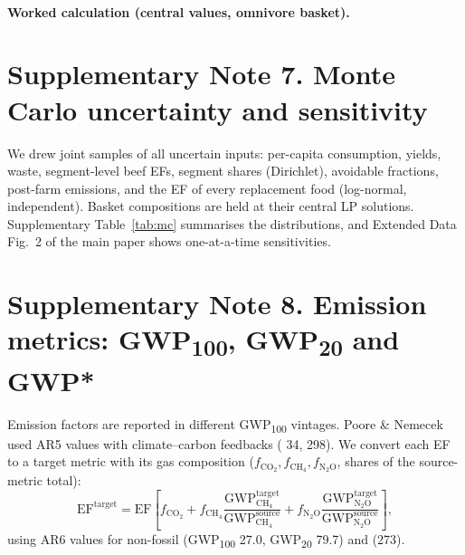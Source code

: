 \documentclass[10pt]{article}
\begin{document}
\paragraph{Worked calculation (central values, omnivore basket).}


\begin{table}[H]
\centering\small
\caption{\textbf{Annual emissions change from replacing all beef eaten by Londoners with nutritionally equivalent baskets.}
Central values. Percentages are relative to London's territorial emissions
(LEGGI 2023) and to London's consumption-based emissions.}
\label{tab:scaling}
\resizebox{\linewidth}{!}{}
\end{table}

\section{Supplementary Note 7. Monte Carlo uncertainty and sensitivity}
\label{si:mc}

We drew \NMC{} joint samples of all uncertain inputs: per-capita
consumption, yields, waste, segment-level beef EFs, segment shares
(Dirichlet), avoidable fractions, post-farm emissions, and the EF of every
replacement food (log-normal, independent). Basket compositions are held at
their central LP solutions. Supplementary Table~\ref{tab:mc} summarises the
distributions, and Extended Data Fig.~2 of the main paper shows one-at-a-time
sensitivities.

\begin{table}[H]
\centering\small
\caption{\textbf{Monte Carlo results for London (Mt \COtwoe{} yr$^{-1}$).} Median and 90\% interval.}
\label{tab:mc}

\end{table}

\section{Supplementary Note 8. Emission metrics: GWP\textsubscript{100}, GWP\textsubscript{20} and GWP*}
\label{si:metrics}

Emission factors are reported in different GWP\textsubscript{100} vintages. Poore \& Nemecek
used AR5 values with climate--carbon feedbacks (\CHfour{} 34, \NtwoO{} 298). We
convert each EF to a target metric with its gas composition
($f_{\mathrm{CO_2}}, f_{\mathrm{CH_4}}, f_{\mathrm{N_2O}}$, shares of the source-metric total):
\begin{equation}
\mathrm{EF}^{\mathrm{target}} = \mathrm{EF}\left[f_{\mathrm{CO_2}} +
f_{\mathrm{CH_4}}\frac{\mathrm{GWP}^{\mathrm{target}}_{\mathrm{CH_4}}}{\mathrm{GWP}^{\mathrm{source}}_{\mathrm{CH_4}}} +
f_{\mathrm{N_2O}}\frac{\mathrm{GWP}^{\mathrm{target}}_{\mathrm{N_2O}}}{\mathrm{GWP}^{\mathrm{source}}_{\mathrm{N_2O}}}\right],
\end{equation}
using AR6 values for non-fossil \CHfour{} (GWP\textsubscript{100} 27.0, GWP\textsubscript{20} 79.7) and \NtwoO{}
(273)\cite{forster2021ar6}.
\end{document}
